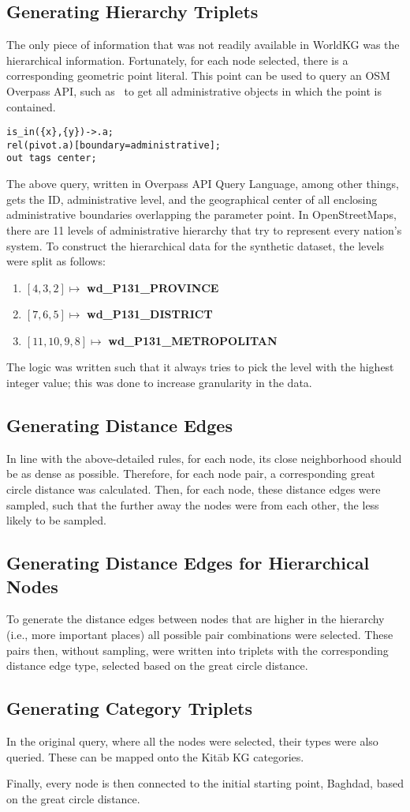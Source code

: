 \subsection{Generating Hierarchy Triplets}
The only piece of information that was not readily available in WorldKG was the hierarchical information.
Fortunately, for each node selected, there is a corresponding geometric point literal.
This point can be used to query an OSM Overpass API, such as~\cite{Overpass} to get all administrative objects
in which the point is contained.

\begin{verbatim}
is_in({x},{y})->.a;
rel(pivot.a)[boundary=administrative];
out tags center;
\end{verbatim}

The above query, written in Overpass API Query Language, among other things, gets the ID, administrative level, and
the geographical center of all enclosing administrative boundaries overlapping the parameter point.
In OpenStreetMaps, there are 11 levels of administrative hierarchy that try to represent every nation's system.
To construct the hierarchical data for the synthetic dataset, the levels were split as follows:

\begin{enumerate}
    \item $[4,3,2] \mapsto$ \textbf{wd\_P131\_PROVINCE}
    \item $[7,6,5] \mapsto$ \textbf{wd\_P131\_DISTRICT}
    \item $[11,10,9,8] \mapsto$ \textbf{wd\_P131\_METROPOLITAN}
\end{enumerate}

The logic was written such that it always tries to pick the level with the highest integer value; this was done
to increase granularity in the data.

\subsection{Generating Distance Edges}
In line with the above-detailed rules, for each node, its close neighborhood should be as dense as possible.
Therefore, for each node pair, a corresponding great circle distance was calculated.
Then, for each node, these distance edges were sampled, such that the further away the nodes were from each other,
the less likely to be sampled.

\subsection{Generating Distance Edges for Hierarchical Nodes}
To generate the distance edges between nodes that are higher in the hierarchy (i.e., more important places)
all possible pair combinations were selected.
These pairs then, without sampling, were written into triplets with the corresponding distance edge type,
selected based on the great circle distance.

\subsection{Generating Category Triplets}
In the original query, where all the nodes were selected, their types were also queried.
These can be mapped onto the Kitāb KG categories.

Finally, every node is then connected to the initial starting point, Baghdad, based on the
great circle distance.
